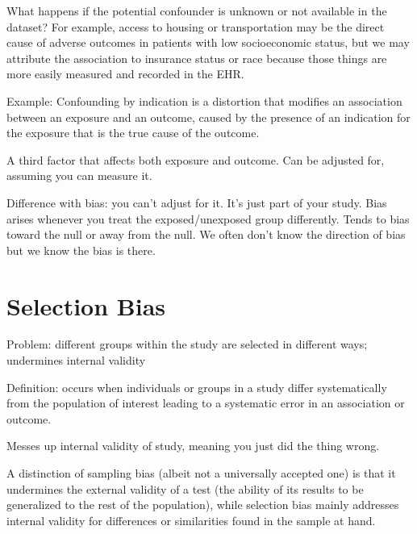 What happens if the potential confounder is unknown or not available in the dataset? For example, access to housing or transportation may be the direct cause of adverse outcomes in patients with low socioeconomic status, but we may attribute the association to insurance status or race because those things are more easily measured and recorded in the EHR. 

Example: Confounding by indication is a distortion that modifies an association between an exposure and an outcome, caused by the presence of an indication for the exposure that is the true cause of the outcome.

A third factor that affects both exposure and outcome. Can be adjusted for, assuming you can measure it. 

Difference with bias: you can't adjust for it. It's just part of your study. Bias arises whenever you treat the exposed/unexposed group differently. Tends to bias toward the null or away from the null. We often don't know the direction of bias but we know the bias is there. 



\section{Selection Bias}

Problem: different groups within the study are selected in different ways; undermines internal validity

Definition: occurs when individuals or groups in a study differ systematically from the population of interest leading to a systematic error in an association or outcome. 

Messes up internal validity of study, meaning you just did the thing wrong. 

A distinction of sampling bias (albeit not a universally accepted one) is that it undermines the external validity of a test (the ability of its results to be generalized to the rest of the population), while selection bias mainly addresses internal validity for differences or similarities found in the sample at hand.


